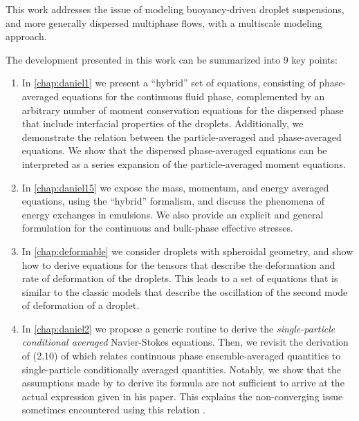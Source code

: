 
This work addresses the issue of modeling buoyancy-driven droplet suspensions, and more generally dispersed multiphase flows, with a multiscale modeling approach. 

The development presented in this work can be summarized into 9 key points:
\begin{enumerate}
    \item 
    In \ref{chap:daniel1} we present a ``hybrid'' set of equations, consisting of phase-averaged equations for the continuous fluid phase, complemented by an arbitrary number of moment conservation equations for the dispersed phase that include interfacial properties of the droplets.
    Additionally, we demonstrate the relation between the particle-averaged and phase-averaged equations. 
    We show that the dispersed phase-averaged equations can be interpreted as a series expansion of the particle-averaged moment equations. 
    \item In \ref{chap:daniel15} we expose the mass, momentum, and energy averaged equations, using the ``hybrid'' formalism, and discuss the phenomena of energy exchanges in emulsions.
    We also provide an explicit and general formulation for the continuous and bulk-phase effective stresses.
    \item In \ref{chap:deformable} we consider droplets with spheroidal geometry, and show how to derive equations for the tensors that describe the deformation and rate of deformation of the droplets. 
    This leads to a set of equations that is similar to the classic models that describe the oscillation of the second mode of deformation of a droplet.
    \item     
    In \ref{chap:daniel2} we propose a generic routine to derive the \textit{single-particle conditional averaged} Navier-Stokes equations. 
    Then, we revisit the derivation of (2.10) of \citet{batchelor1972sedimentation} which relates continuous phase ensemble-averaged quantities to single-particle conditionally averaged quantities.
    Notably, we show that the assumptions made by \citet{batchelor1972sedimentation} to derive its formula are not sufficient to arrive at the actual expression given in his paper.
    This explains the non-converging issue sometimes encountered using this relation \citep{batchelor1972sedimentation}. 

\end{enumerate}
